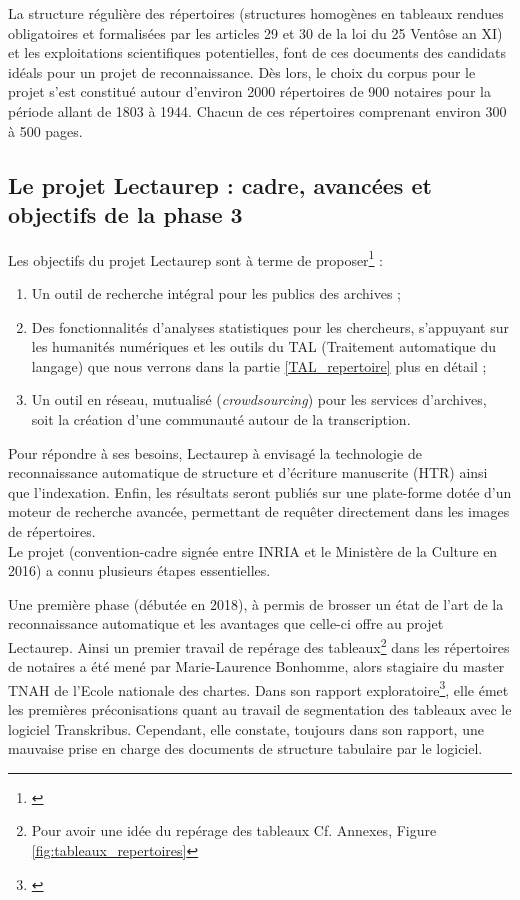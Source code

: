 La structure régulière des répertoires (structures homogènes en tableaux rendues obligatoires et formalisées par les articles 29 et 30 de la loi du 25 Ventôse an XI) et les exploitations scientifiques potentielles, font de ces documents des candidats idéals pour un projet de reconnaissance. Dès lors, le choix du corpus pour le projet s'est constitué autour d'environ 2000 répertoires de 900 notaires pour la période allant de 1803 à 1944. Chacun de ces répertoires comprenant environ 300 à 500 pages.

\subsection{Le projet Lectaurep : cadre, avancées et objectifs de la phase 3}

Les objectifs du projet Lectaurep sont à terme de proposer\footnote{\cite{chague_lectaurep_2019}} :
\begin{enumerate}
    \item Un outil de recherche intégral pour les publics des archives ;
    \item Des fonctionnalités d'analyses statistiques pour les chercheurs, s'appuyant sur les humanités numériques et les outils du TAL (Traitement automatique du langage) que nous verrons dans la partie \ref{TAL_repertoire} plus en détail ;
    \item Un outil en réseau, mutualisé (\textit{crowdsourcing}) pour les services d'archives, soit la création d'une communauté autour de la transcription. 
\end{enumerate}

Pour répondre à ses besoins, Lectaurep à envisagé la technologie de reconnaissance automatique de structure et d'écriture manuscrite (HTR) ainsi que l'indexation. Enfin, les résultats seront publiés sur une plate-forme dotée d'un moteur de recherche avancée, permettant de requêter directement dans les images de répertoires.\\

Le projet (convention-cadre signée entre INRIA et le Ministère de la Culture en 2016) a connu plusieurs étapes essentielles.

Une première phase (débutée en 2018), à permis de brosser un état de l'art de la reconnaissance automatique et les avantages que celle-ci offre au projet Lectaurep. Ainsi un premier travail de repérage des tableaux\footnote{Pour avoir une idée du repérage des tableaux Cf. Annexes, Figure \ref{fig:tableaux_repertoires}} dans les répertoires de notaires a été mené par Marie-Laurence Bonhomme, alors stagiaire du master TNAH de l'Ecole nationale des chartes. Dans son rapport exploratoire\footnote{\cite{bonhomme_repertoire_2018}}, elle émet les premières préconisations quant au travail de segmentation des tableaux avec le logiciel Transkribus. Cependant, elle constate, toujours dans son rapport, une mauvaise prise en charge des documents de structure tabulaire par le logiciel. 

